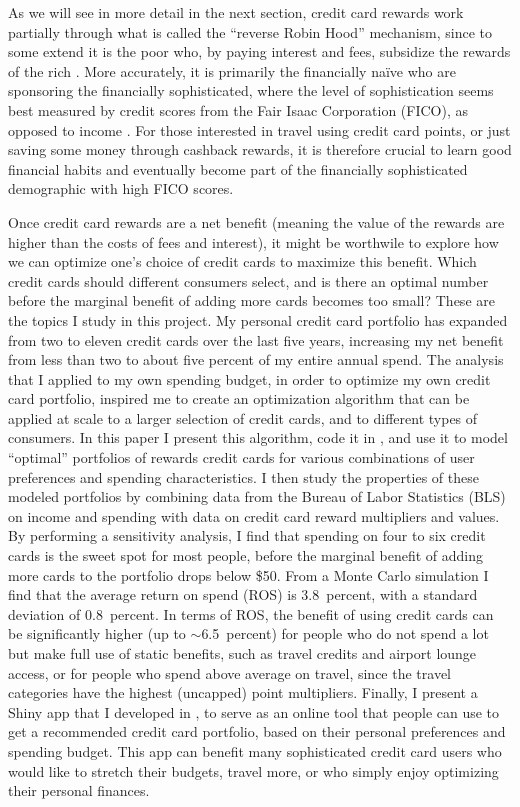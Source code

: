 As we will see in more detail in the next section, credit card rewards work partially through what is called the ``reverse Robin Hood'' mechanism, since to some extend it is the poor who, by paying interest and fees, subsidize the rewards of the rich \citep{wsj:2010}.
More accurately, it is primarily the financially na\"{i}ve who are sponsoring the financially sophisticated, where the level of sophistication seems best measured by credit scores from the Fair Isaac Corporation (FICO), as opposed to income \citep*{agaretal:2023}.
For those interested in travel using credit card points, or just saving some money through cashback rewards, it is therefore crucial to learn good financial habits and eventually become part of the financially sophisticated demographic with high FICO scores. 

Once credit card rewards are a net benefit (meaning the value of the rewards are higher than the costs of fees and interest), it might be worthwile to explore how we can optimize one's choice of credit cards to maximize this benefit. Which credit cards should different consumers select, and is there an optimal number before the marginal benefit of adding more cards becomes too small?  
These are the topics I study in this project. 
My personal credit card portfolio has expanded from two to eleven credit cards over the last five years, increasing my net benefit from less than two to about five percent of my entire annual spend.
The analysis that I applied to my own spending budget, in order to optimize my own credit card portfolio, inspired me to create an optimization algorithm that can be applied at scale to a larger selection of credit cards, and to different types of consumers. 
In this paper I present this algorithm, code it in \sR, and use it to model ``optimal'' portfolios of rewards credit cards for various combinations of user preferences and spending characteristics. 
I then study the properties of these modeled portfolios by combining data from the Bureau of Labor Statistics (BLS) on income and spending with data on credit card reward multipliers and values. 
By performing a sensitivity analysis, I find that spending on four to six credit cards is the sweet spot for most people, before the marginal benefit of adding more cards to the portfolio drops below \$50. 
From a Monte Carlo simulation I find that the average return on spend (ROS) is 3.8~percent, with a standard deviation of 0.8~percent. 
In terms of ROS, the benefit of using credit cards can be significantly higher (up to $\sim$6.5~percent) for people who do not spend a lot but make full use of static benefits, such as travel credits and airport lounge access, or for people who spend above average on travel, since the travel categories have the highest (uncapped) point multipliers. 
Finally, I present a \textsf{Shiny} app that I developed in \sR, to serve as an online tool that people can use to get a recommended credit card portfolio, based on their personal preferences and spending budget.
This app can benefit many sophisticated credit card users who would like to stretch their budgets, travel more, or who simply enjoy optimizing their personal finances.

